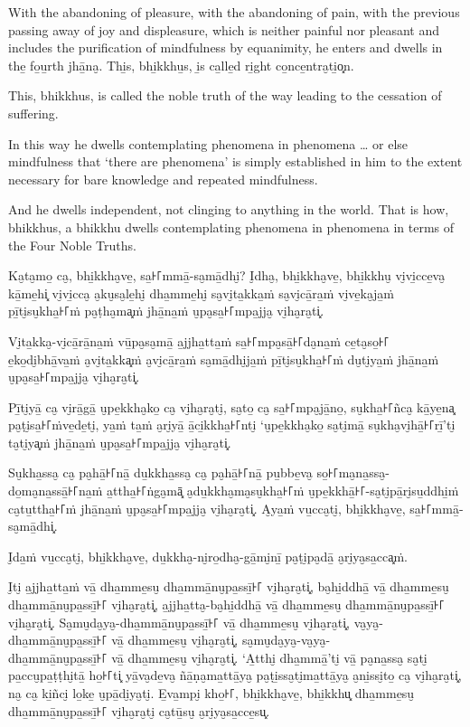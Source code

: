 With the abandoning of pleasure, with the abandoning of pain, with the previous
passing away of joy and displeasure, which is neither painful nor pleasant and
includes the purification of mindfulness by equanimity, he enters and dwells in
the̱ fo̱u̱rth jhā̱na̮. Thi̱s, bhi̱kkhu̱s, i̱s ca̱lle̱d ri̱ght co̱nce̱ntra̮ti̱o͓n.

This, bhikkhus, is called the noble truth of the way leading to the cessation of
suffering.

In this way he dwells contemplating phenomena in phenomena \ldots{} or else
mindfulness that ‘there are phenomena’ is simply established in him to the
extent necessary for bare knowledge and repeated mindfulness.

And he dwells independent, not clinging to anything in the world. That is how,
bhikkhus, a bhikkhu dwells contemplating phenomena in phenomena in terms of the
Four Noble Truths.



\paliPage

Ka̮ta̮mo̱ ca̮, bhi̱kkha̮ve̱, sa̱꜔꜒mmā̱-sa̮mā̱dhi̮? I̮dha̮, bhi̱kkha̮ve̱, bhi̱kkhu̮ vi̮vi̱cce̱va̮ kā̱me̱hi͓
vi̮vi̱cca̮ a̮ku̮sa̮le̱hi̮ dha̱mme̱hi̮ sa̮vi̮ta̱kka̱ṁ sa̮vi̮cā̱ra̱ṁ vi̮ve̱ka̮ja̱ṁ pī̱ti̮su̮kha̱꜔꜒ṁ pa̮ṭha̮ma͓ṁ
jhā̱na̱ṁ u̮pa̮sa̱꜔꜒mpa̱jja̮ vi̮ha̮ra̮ti͓.

Vi̮ta̱kka̮-vi̮cā̱rā̱na̱ṁ vū̱pa̮sa̮mā̱ a̱jjha̱tta̱ṁ sa̱꜔꜒mpa̮sā̱꜔꜒da̮na̱ṁ ce̱ta̮so̱꜔꜒ e̱ko̱di̮bhā̱va̱ṁ a̮vi̮ta̱kka͓ṁ
a̮vi̮cā̱ra̱ṁ sa̮mā̱dhi̮ja̱ṁ pī̱ti̮su̮kha̱꜔꜒ṁ du̮ti̮ya̱ṁ jhā̱na̱ṁ u̮pa̮sa̱꜔꜒mpa̱jja̮ vi̮ha̮ra̮ti͓.

Pī̱ti̮yā̱ ca̮ vi̮rā̱gā̱ u̮pe̱kkha̮ko̱ ca̮ vi̮ha̮ra̮ti̮, sa̮to̱ ca̮ sa̱꜔꜒mpa̮jā̱no̱, su̮kha̱꜔꜒ñca̮ kā̱ye̱na͓
pa̮ṭi̮sa̱꜔꜒ṁve̱de̱ti̮, ya̱ṁ ta̱ṁ a̮ri̮yā̱ ā̱ci̱kkha̱꜔꜒nti̮ ‘u̮pe̱kkha̮ko̱ sa̮ti̮mā̱ su̮kha̮vi̮hā̱꜔꜒rī̱’ti̮ ta̮ti̮ya͓ṁ
jhā̱na̱ṁ u̮pa̮sa̱꜔꜒mpa̱jja̮ vi̮ha̮ra̮ti͓.

Su̮kha̱ssa̮ ca̮ pa̮hā̱꜔꜒nā̱ du̱kkha̱ssa̮ ca̮ pa̮hā̱꜔꜒nā̱ pu̱bbe̱va̮ so̱꜔꜒ma̮na̱ssa̮-do̱ma̮na̱ssā̱꜔꜒na̱ṁ a̱ttha̱꜔꜒ṅga̮mā͓
a̮du̱kkha̮ma̮su̮kha̱꜔꜒ṁ u̮pe̱kkhā̱꜔꜒-sa̮ti̮pā̱ri̮su̱ddhi̱ṁ ca̮tu̱ttha̱꜔꜒ṁ jhā̱na̱ṁ u̮pa̮sa̱꜔꜒mpa̱jja̮ vi̮ha̮ra̮ti͓.
A̮ya̱ṁ vu̱cca̮ti̮, bhi̱kkha̮ve̱, sa̱꜔꜒mmā̱-sa̮mā̱dhi͓.

I̮da̱ṁ vu̱cca̮ti̮, bhi̱kkha̮ve̱, du̱kkha̮-ni̮ro̱dha̮-gā̱mi̮nī̱ pa̮ṭi̮pa̮dā̱ a̮ri̮ya̮sa̱cca͓ṁ.

I̮ti̮ a̱jjha̱tta̱ṁ vā̱ dha̱mme̱su̮ dha̱mmā̱nu̮pa̱ssī̱꜔꜒ vi̮ha̮ra̮ti͓,
ba̮hi̱ddhā̱ vā̱ dha̱mme̱su̮ dha̱mmā̱nu̮pa̱ssī̱꜔꜒ vi̮ha̮ra̮ti͓,
a̱jjha̱tta̮-ba̮hi̱ddhā̱ vā̱ dha̱mme̱su̮ dha̱mmā̱nu̮pa̱ssī̱꜔꜒ vi̮ha̮ra̮ti͓.
Sa̮mu̮da̮ya̮-dha̱mmā̱nu̮pa̱ssī̱꜔꜒ vā̱ dha̱mme̱su̮ vi̮ha̮ra̮ti͓,
va̮ya̮-dha̱mmā̱nu̮pa̱ssī̱꜔꜒ vā̱ dha̱mme̱su̮ vi̮ha̮ra̮ti͓,
sa̮mu̮da̮ya̮-va̮ya̮-\\ dha̱mmā̱nu̮pa̱ssī̱꜔꜒ vā̱ dha̱mme̱su̮ vi̮ha̮ra̮ti͓.
‘A̱tthi̮ dha̱mmā̱’ti̮ vā̱ pa̮na̱ssa̮ sa̮ti̮ pa̱ccu̮pa̱ṭṭhi̮tā̱ ho̱꜔꜒ti͓
yā̱va̮de̱va̮ ñā̱ṇa̮ma̱ttā̱ya̮ pa̮ṭi̱ssa̮ti̮ma̱ttā̱ya̮ a̮ni̱ssi̮to̱ ca̮ vi̮ha̮ra̮ti͓,
na̮ ca̮ ki̱ñci̮ lo̱ke̱ u̮pā̱di̮ya̮ti̮. E̱va̱mpi̮ kho̱꜔꜒, bhi̱kkha̮ve̱, bhi̱kkhu͓
dha̱mme̱su̮ dha̱mmā̱nu̮pa̱ssī̱꜔꜒ vi̮ha̮ra̮ti̮ ca̮tū̱su̮ a̮ri̮ya̮sa̱cce̱su͓.


